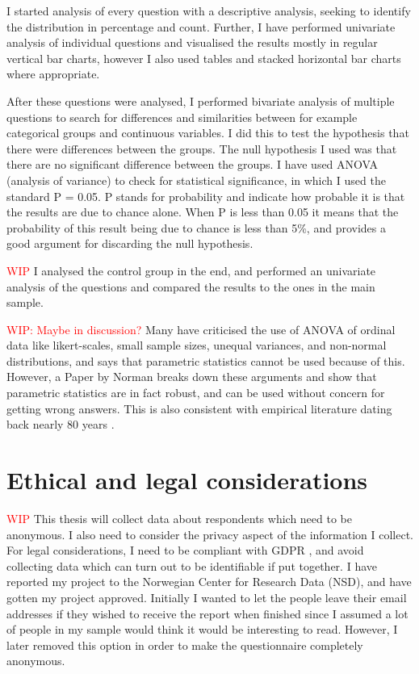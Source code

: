 I started analysis of every question with a descriptive analysis, seeking to identify the distribution in percentage and count. Further, I have performed univariate analysis of individual questions and visualised the results mostly in regular vertical bar charts, however I also used tables and stacked horizontal bar charts where appropriate. 

After these questions were analysed, I performed bivariate analysis of multiple questions to search for differences and similarities between for example categorical groups and continuous variables. I did this to test the hypothesis that there were differences between the groups. The null hypothesis I used was that there are no significant difference between the groups. I have used ANOVA (analysis of variance) to check for statistical significance, in which I used the standard P = 0.05. P stands for probability and indicate how probable it is that the results are due to chance alone. When P is less than 0.05 it means that the probability of this result being due to chance is less than 5\%, and provides a good argument for discarding the null hypothesis. 

\textcolor{red}{WIP} 
I analysed the control group in the end, and performed an univariate analysis of the questions and compared the results to the ones in the main sample. 

\textcolor{red}{WIP: Maybe in discussion?} 
Many have criticised the use of ANOVA of ordinal data like likert-scales, small sample sizes, unequal variances, and non-normal distributions, and says that parametric statistics cannot be used because of this. However, a Paper by Norman \cite{Norman2010} breaks down these arguments and show that parametric statistics are in fact robust, and can be used without concern for getting wrong answers. This is also consistent with empirical literature dating back nearly 80 years \cite{Norman2010}. 

\section{Ethical and legal considerations}
\textcolor{red}{WIP}
This thesis will collect data about respondents which need to be anonymous. I also need to consider the privacy aspect of the information I collect. For legal considerations, I need to be compliant with GDPR \cite{EUdataregulations2018}, and avoid collecting data which can turn out to be identifiable if put together. I have reported my project to the Norwegian Center for Research Data (NSD), and have gotten my project approved. Initially I wanted to let the people leave their email addresses if they wished to receive the report when finished since I assumed a lot of people in my sample would think it would be interesting to read. However, I later removed this option in order to make the questionnaire completely anonymous. 



